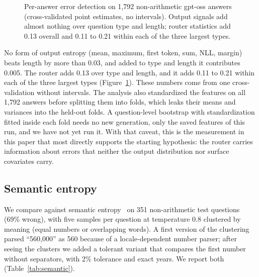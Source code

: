 \documentclass[11pt]{article}
\begin{document}
\begin{figure}[t]
\centering
{}
\caption{Per-answer error detection on 1,792 non-arithmetic gpt-oss answers (cross-validated point estimates, no intervals). Output signals add almost nothing over question type and length; router statistics add 0.13 overall and 0.11 to 0.21 within each of the three largest types.}
\label{fig:response}
\end{figure}

No form of output entropy (mean, maximum, first token, sum, NLL, margin) beats length by more than 0.03, and added to type and length it contributes 0.005.
The router adds 0.13 over type and length, and it adds 0.11 to 0.21 within each of the three largest types (Figure~\ref{fig:response}).
These numbers come from one cross-validation without intervals.
The analysis also standardized the features on all 1,792 answers before splitting them into folds, which leaks their means and variances into the held-out folds.
A question-level bootstrap with standardization fitted inside each fold needs no new generation, only the saved features of this run, and we have not yet run it.
With that caveat, this is the measurement in this paper that most directly supports the starting hypothesis: the router carries information about errors that neither the output distribution nor surface covariates carry.

\subsection{Semantic entropy}
\label{sec:semantic}

We compare against semantic entropy~\citep{kuhn2023semantic,farquhar2024detecting} on 351 non-arithmetic test questions (69\% wrong), with five samples per question at temperature 0.8 clustered by meaning (equal numbers or overlapping words).
A first version of the clustering parsed ``560,000'' as 560 because of a locale-dependent number parser; after seeing the clusters we added a tolerant variant that compares the first number without separators, with 2\% tolerance and exact years.
We report both (Table~\ref{tab:semantic}).
\end{document}
